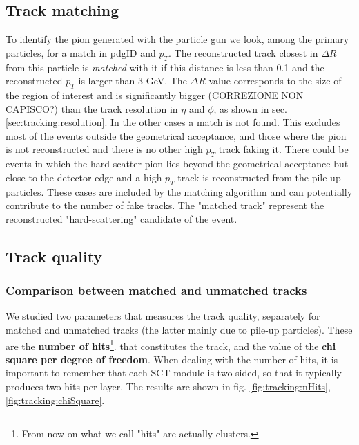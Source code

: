 \documentclass[a4paper,twoside,12pt]{article}
\begin{document}
\subsection{Track matching}\label{subsec:tracking:matching}
To identify the pion generated with the particle gun we look, among the primary particles, for a match in pdgID and $p_{T}$. The
reconstructed track closest in $\Delta R$ from this particle is \textit{matched} with it if this distance is less than 0.1 and the reconstructed $p_{T}$ is 
larger than 3 GeV. The $\Delta R$ value corresponds to the size of the 
region of interest and is significantly bigger (CORREZIONE NON CAPISCO?) than the track resolution in $\eta$ and $\phi$, as shown in sec. \ref{sec:tracking:resolution}. In the other cases a match
is not found. This excludes most of the events outside the geometrical acceptance, and those where the pion is not reconstructed and there is no other 
high $p_{T}$ track faking it. There could be events in which the hard-scatter pion lies beyond the geometrical acceptance but close to the detector edge 
and a high $p_{T}$ track is reconstructed from the pile-up particles. These cases are included by the matching algorithm and can potentially contribute
to the number of fake tracks. The "matched track"
represent the reconstructed "hard-scattering" candidate of the event.  

\subsection{Track quality}\label{subsec:tracking:quality}

\subsubsection{Comparison between matched and unmatched tracks}

We studied two parameters that measures the track quality, separately for matched and unmatched tracks (the latter mainly due to pile-up particles). These
are the \textbf{number of hits}\footnote{From now on what we call "hits" are actually clusters.}. that constitutes the track, and the value of the \textbf{chi square per degree of freedom}. When dealing with the number
of hits, it is important to remember that each SCT module is two-sided, so that it typically produces two hits per layer. The results are shown in fig. \ref{fig:tracking:nHits}, \ref{fig:tracking:chiSquare}. \\
\end{document}
